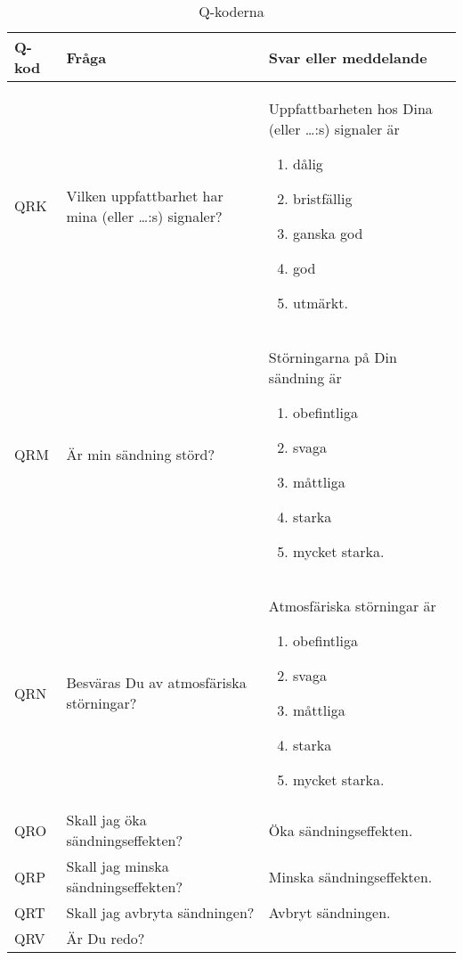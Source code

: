 \begin{table}
  \label{tab:q-kod}
  \caption{Q-koderna}
  \begin{tabular}{lp{6cm}p{6cm}}
    Q-kod & Fråga & Svar eller meddelande \\
    \hline
    QRK &
    Vilken uppfattbarhet har mina (eller \dots:s) signaler?
    &
    Uppfattbarheten hos Dina (eller \dots:s) signaler är
    \vspace{-\topsep}
    \begin{enumerate}[noitemsep]
    \item dålig
    \item bristfällig
    \item ganska god
    \item god
    \item utmärkt.
    \end{enumerate} \\
    QRM &
    Är min sändning störd?
    &
    Störningarna på Din sändning är
    \vspace{-\topsep}
    \begin{enumerate}[noitemsep]
    \item obefintliga
    \item svaga
    \item måttliga
    \item starka
    \item mycket starka.
    \end{enumerate} \\
    QRN
    &
    Besväras Du av atmosfäriska störningar?
    &
    Atmosfäriska störningar är
    \vspace{-\topsep}
    \begin{enumerate}[noitemsep]
    \item obefintliga
    \item svaga
    \item måttliga
    \item starka
    \item mycket starka.
    \end{enumerate} \\
    QRO
    &
    Skall jag öka sändningseffekten?
    &
    Öka sändningseffekten.
    \\
    QRP
    &
    Skall jag minska sändningseffekten?
    &
    Minska sändningseffekten.
    \\
    QRT
    &
    Skall jag avbryta sändningen?
    &
    Avbryt sändningen.
    \\
    QRV
    &
    Är Du redo?
    &

\end{tabular}
\end{table}
